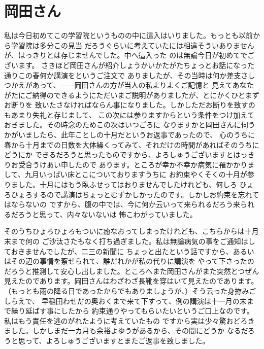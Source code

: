 \section{岡田さん}
私は今日初めてこの学習院というものの中に這入はいりました。もっとも以前から学習院は多分この見当
だろうぐらいに考えていたには相違そういありませんが、はっきりとは存じませんでした。中へ這入った
のは無論今日が初めてでございます。
さきほど岡田さんが紹介しょうかいかたがたちょっとお話になった通りこの春何か講演をというご注文で
ありましたが、その当時は何か差支さしつかえがあって、――岡田さんの方が当人の私よりよくご記憶と
見えてあなたがたにご納得のできるようにただいまご説明がありましたが、とにかくひとまずお断りを
致いたさなければならん事になりました。しかしただお断りを致すのもあまり失礼と存じまして、
この次には参りますからという条件をつけ加えておきました。その時念のためこの次はいつごろに
なりますかと岡田さんに伺うかがいましたら、此年ことしの十月だというお返事であったので、
心のうちに春から十月までの日数を大体繰くってみて、それだけの時間があればそのうちにどうにか
できるだろうと思ったものですから、よろしゅうございますとはっきりお受合うけあい申したので
あります。ところが幸か不幸か病気に罹かかりまして、九月いっぱい床とこについておりますうちに
お約束やくそくの十月が参りました。十月にはもう臥ふせってはおりませんでしたけれども、何しろ
ひょろひょろするので講演はちょっとむずかしかったのです。しかしお約束を忘れてはならないの
ですから、腹の中では、今に何か云いって来られるだろう来られるだろうと思って、内々ないないは
怖こわがっていました。

そのうちひょろひょろもついに癒なおってしまったけれども、こちらからは十月末まで何の
ご沙汰さたもなく打ち過ぎました。私は無論病気の事をご通知はしておきませんでしたが、二三の新聞に
ちょっと出たという話ですから、あるいはその辺の事情を察せられて、誰だれかが私の代りに講演を
やって下さったのだろうと推測して安心し出しました。ところへまた岡田さんがまた突然とつぜん
見えたのであります。岡田さんはわざわざ長靴を穿はいて見えたのであります。
（もっとも雨の降る日であったからでもありましょうが、）そう云った身拵みごしらえで、
早稲田わせだの奥おくまで来て下すって、例の講演は十一月の末まで繰り延ばす事にしたから
約束通りやってもらいたいというご口上なのです。私はもう責任を逃のがれたように考えていたもの
ですから実は少々驚おどろきました。しかしまだ一カ月も余裕よゆうがあるから、その間にどうか
なるだろうと思って、よろしゅうございますとまたご返事を致しました。
